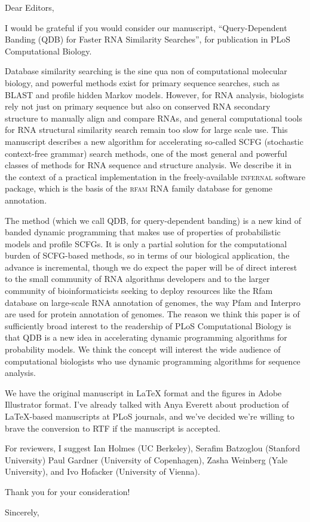 \documentclass[10pt]{jfrcletter}
\begin{document}
\signature{Sean R. Eddy, Ph.D.}

%
\begin{letter}{}


%
\opening{Dear Editors,}

I would be grateful if you would consider our manuscript,
``Query-Dependent Banding (QDB) for Faster RNA Similarity Searches'',
for publication in PLoS Computational Biology.  

Database similarity searching is the sine qua non of computational
molecular biology, and powerful methods exist for primary sequence
searches, such as BLAST and profile hidden Markov models. However, for
RNA analysis, biologists rely not just on primary sequence but also on
conserved RNA secondary structure to manually align and compare RNAs,
and general computational tools for RNA structural similarity search
remain too slow for large scale use. This manuscript describes a new
algorithm for accelerating so-called SCFG (stochastic context-free
grammar) search methods, one of the most general and powerful classes
of methods for RNA sequence and structure analysis. We describe it in
the context of a practical implementation in the freely-available
\textsc{infernal} software package, which is the basis of the
\textsc{rfam} RNA family database for genome annotation.

The method (which we call QDB, for query-dependent banding) is a new
kind of banded dynamic programming that makes use of properties of
probabilistic models and profile SCFGs. It is only a partial solution
for the computational burden of SCFG-based methods, so in terms of our
biological application, the advance is incremental, though we do
expect the paper will be of direct interest to the small community of
RNA algorithms developers and to the larger community of
bioinformaticists seeking to deploy resources like the Rfam database
on large-scale RNA annotation of genomes, the way Pfam and Interpro
are used for protein annotation of genomes.  The reason we think this
paper is of sufficiently broad interest to the readership of PLoS
Computational Biology is that QDB is a new idea in accelerating
dynamic programming algorithms for probability models. We think the
concept will interest the wide audience of computational biologists
who use dynamic programming algorithms for sequence analysis.

We have the original manuscript in LaTeX format and the figures in
Adobe Illustrator format. I've already talked with Anya Everett about
production of LaTeX-based manuscripts at PLoS journals, and we've
decided we're willing to brave the conversion to RTF if the manuscript
is accepted.

For reviewers, I suggest Ian Holmes (UC Berkeley), Serafim Batzoglou
(Stanford University) Paul Gardner (University of Copenhagen), Zasha
Weinberg (Yale University), and Ivo Hofacker (University of Vienna).

Thank you for your consideration!

\closing{Sincerely,}

\end{letter}
\end{document}
